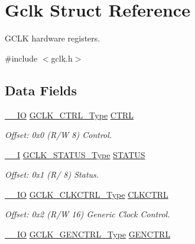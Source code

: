 \hypertarget{struct_gclk}{}\section{Gclk Struct Reference}
\label{struct_gclk}


G\+C\+LK hardware registers.  




{\ttfamily \#include $<$gclk.\+h$>$}

\subsection*{Data Fields}
\begin{DoxyCompactItemize}
\item 
\mbox{\hyperlink{core__cm0plus_8h_aec43007d9998a0a0e01faede4133d6be}{\+\_\+\+\_\+\+IO}} \mbox{\hyperlink{union_g_c_l_k___c_t_r_l___type}{G\+C\+L\+K\+\_\+\+C\+T\+R\+L\+\_\+\+Type}} \mbox{\hyperlink{struct_gclk_a6625eefafb87e98956f3ef6e9b3470b9}{C\+T\+RL}}
\begin{DoxyCompactList}\small\item\em Offset\+: 0x0 (R/W 8) Control. \end{DoxyCompactList}\item 
\mbox{\hyperlink{core__cm0plus_8h_af63697ed9952cc71e1225efe205f6cd3}{\+\_\+\+\_\+I}} \mbox{\hyperlink{union_g_c_l_k___s_t_a_t_u_s___type}{G\+C\+L\+K\+\_\+\+S\+T\+A\+T\+U\+S\+\_\+\+Type}} \mbox{\hyperlink{struct_gclk_a3abd65232ccb4f986d0e884e31b37c6b}{S\+T\+A\+T\+US}}
\begin{DoxyCompactList}\small\item\em Offset\+: 0x1 (R/ 8) Status. \end{DoxyCompactList}\item 
\mbox{\hyperlink{core__cm0plus_8h_aec43007d9998a0a0e01faede4133d6be}{\+\_\+\+\_\+\+IO}} \mbox{\hyperlink{union_g_c_l_k___c_l_k_c_t_r_l___type}{G\+C\+L\+K\+\_\+\+C\+L\+K\+C\+T\+R\+L\+\_\+\+Type}} \mbox{\hyperlink{struct_gclk_a63c060e40f0f959a293301c86eea0d31}{C\+L\+K\+C\+T\+RL}}
\begin{DoxyCompactList}\small\item\em Offset\+: 0x2 (R/W 16) Generic Clock Control. \end{DoxyCompactList}\item 
\mbox{\hyperlink{core__cm0plus_8h_aec43007d9998a0a0e01faede4133d6be}{\+\_\+\+\_\+\+IO}} \mbox{\hyperlink{union_g_c_l_k___g_e_n_c_t_r_l___type}{G\+C\+L\+K\+\_\+\+G\+E\+N\+C\+T\+R\+L\+\_\+\+Type}} \mbox{\hyperlink{struct_gclk_aa25fe955229fab71288dcc86fe3e672b}{G\+E\+N\+C\+T\+RL}}

\end{DoxyCompactItemize}
